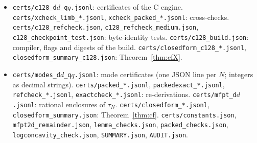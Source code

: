 \documentclass[11pt,a4paper]{article}
\theoremstyle{definition}
\theoremstyle{remark}
\begin{document}
\begin{itemize}
\item \texttt{certs/c128\_d$d$\_q$q$.jsonl}: certificates of the C engine. \texttt{certs/xcheck\_limb\_*.jsonl}, \texttt{xcheck\_packed\_*.jsonl}: cross-checks. \texttt{certs/c128\_refcheck.json}, \texttt{c128\_refcheck\_medium.json}, \texttt{c128\_checkpoint\_test.json}: byte-identity tests. \texttt{certs/c128\_build.json}: compiler, flags and digests of the build. \texttt{certs/closedform\_c128\_*.jsonl}, \texttt{closedform\_summary\_c128.json}: Theorem~\ref{thm:cfX}.
\item \texttt{certs/modes\_d$d$\_q$q$.jsonl}: mode certificates (one JSON line per $N$; integers as decimal strings). \texttt{certs/packed\_*.jsonl}, \texttt{packedexact\_*.jsonl}, \texttt{refcheck\_*.jsonl}, \texttt{exactcheck\_*.jsonl}: re-derivations. \texttt{certs/mfpt\_d$d$.jsonl}: rational enclosures of $\tau_N$. \texttt{certs/closedform\_*.jsonl}, \texttt{closedform\_summary.json}: Theorem~\ref{thm:cf}. \texttt{certs/constants.json}, \texttt{mfpt2d\_remainder.json}, \texttt{lemma\_checks.json}, \texttt{packed\_checks.json}, \texttt{logconcavity\_check.json}, \texttt{SUMMARY.json}, \texttt{AUDIT.json}.
\end{itemize}
\end{document}
